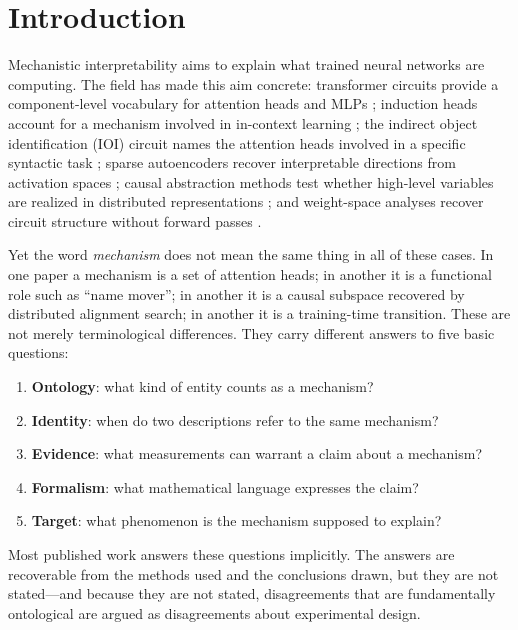 \documentclass[11pt]{article}
\theoremstyle{remark}
\begin{document}
\tableofcontents
\newpage

\section{Introduction}

Mechanistic interpretability aims to explain what trained neural
networks are computing.  The field has made this aim concrete:
transformer circuits provide a component-level vocabulary for attention
heads and MLPs \citep{elhage2021}; induction heads account for a
mechanism involved in in-context learning \citep{olsson2022}; the
indirect object identification (IOI) circuit names the attention heads
involved in a specific syntactic task \citep{wang2022}; sparse
autoencoders recover interpretable directions from activation spaces
\citep{bricken2023,templeton2024}; causal abstraction methods test
whether high-level variables are realized in distributed representations
\citep{geiger2021,geiger2024}; and weight-space analyses recover circuit
structure without forward passes \citep{tower2026weight}.

Yet the word \emph{mechanism} does not mean the same thing in all of
these cases.  In one paper a mechanism is a set of attention heads;
in another it is a functional role such as ``name mover''; in another
it is a causal subspace recovered by distributed alignment search; in
another it is a training-time transition.  These are not merely
terminological differences.  They carry different answers to five basic
questions:
\begin{enumerate}[leftmargin=*,label=(\arabic*)]
\item \textbf{Ontology}: what kind of entity counts as a mechanism?
\item \textbf{Identity}: when do two descriptions refer to the same mechanism?
\item \textbf{Evidence}: what measurements can warrant a claim about a mechanism?
\item \textbf{Formalism}: what mathematical language expresses the claim?
\item \textbf{Target}: what phenomenon is the mechanism supposed to explain?
\end{enumerate}
Most published work answers these questions implicitly.  The answers are
recoverable from the methods used and the conclusions drawn, but they are
not stated---and because they are not stated, disagreements that are
fundamentally ontological are argued as disagreements about experimental
design.
\end{document}
